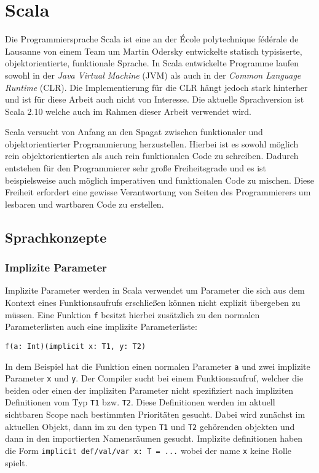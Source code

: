 \section{Scala}

Die Programmiersprache Scala ist eine an der École polytechnique fédérale de  Lausanne von einem
Team um Martin Odersky entwickelte statisch typisiserte,  objektorientierte, funktionale
Sprache\cite{scala}. In Scala entwickelte Programme laufen  sowohl in der \textit{Java Virtual
Machine} (JVM) als auch in der \textit{Common  Language Runtime} (CLR). Die Implementierung für die
CLR hängt jedoch stark  hinterher und ist für diese Arbeit auch nicht von Interesse. Die aktuelle
Sprachversion ist Scala 2.10 welche auch im Rahmen dieser Arbeit verwendet wird.

Scala versucht von Anfang an den Spagat zwischen funktionaler und  objektorientierter Programmierung
herzustellen. Hierbei ist es sowohl möglich  rein objektorientierten als auch rein funktionalen Code
zu schreiben. Dadurch  entstehen für den Programmierer sehr große Freiheitsgrade und es ist
beispielsweise auch möglich imperativen und funktionalen Code zu mischen. Diese  Freiheit erfordert
eine gewisse Verantwortung von Seiten des Programmierers um  lesbaren und wartbaren Code zu
erstellen.

\subsection{Sprachkonzepte}

\subsubsection{Implizite Parameter}

Implizite Parameter werden in Scala verwendet um Parameter die sich aus dem  Kontext eines
Funktionsaufrufs erschließen können nicht explizit übergeben zu  müssen. Eine Funktion \texttt{f}
besitzt hierbei zusätzlich zu den normalen  Parameterlisten auch eine implizite Parameterliste:

\begin{lstlisting}
f(a: Int)(implicit x: T1, y: T2)
\end{lstlisting}

In dem Beispiel hat die Funktion einen normalen Parameter \texttt{a} und zwei  implizite Parameter
\texttt{x} und \texttt{y}. Der Compiler sucht bei einem  Funktionsaufruf, welcher die beiden oder
einen der impliziten Parameter nicht  spezifiziert nach impliziten Definitionen vom Typ \texttt{T1}
bzw. \texttt{T2}.  Diese Definitionen werden im aktuell sichtbaren Scope nach bestimmten
Prioritäten gesucht. Dabei wird zunächst im aktuellen Objekt, dann im zu den  typen \texttt{T1} und
\texttt{T2} gehörenden objekten und dann in den  importierten Namensräumen gesucht. Implizite
definitionen haben die Form  \texttt{implicit def/val/var x: T = ...} wobei der name \texttt{x}
keine Rolle  spielt.

